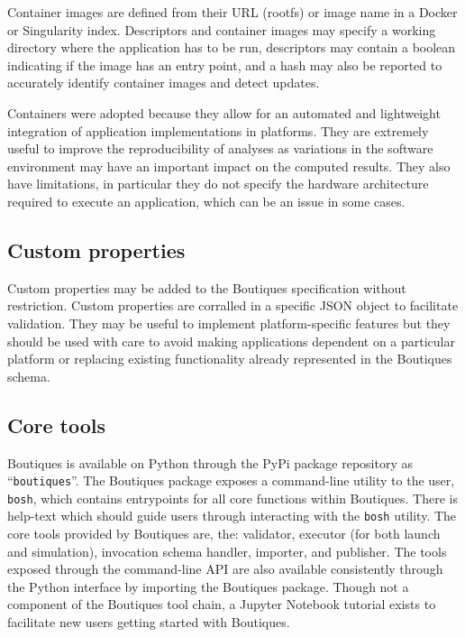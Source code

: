 \documentclass{article}
\newcommand{\boutiques}{Boutiques\xspace}
\begin{document}
Container images are defined from their URL (rootfs) or image name in
a Docker or Singularity index. Descriptors and container images may
specify a working directory where the application has to be run,
descriptors may contain a boolean indicating if the image has an entry
point, and a hash may also be reported to accurately identify
container images and detect updates.

Containers were adopted because they allow for an automated and
lightweight integration of application implementations in
platforms. They are extremely useful to improve the reproducibility of
analyses as variations in the software environment may have an
important impact on the computed results. They also have limitations,
in particular they do not specify the hardware architecture required
to execute an application, which can be an issue in some cases.


\subsection{Custom properties}

Custom properties may be added to the Boutiques specification without
restriction. Custom properties are corralled in a specific JSON object
to facilitate validation. They may be useful to implement
platform-specific features but they should be used with care to avoid
making applications dependent on a particular platform or replacing
existing functionality already represented in the \boutiques schema.

\subsection{Core tools} 

\boutiques is available on Python through the PyPi package repository
as ``\texttt{boutiques}''. The \boutiques package exposes a
command-line utility to the user, \texttt{bosh}, which contains
entrypoints for all core functions within \boutiques. There is
help-text which should guide users through interacting with the
\texttt{bosh} utility. The core tools provided by \boutiques are, the:
validator, executor (for both launch and simulation), invocation
schema handler, importer, and publisher. The tools exposed through the
command-line API are also available consistently through the Python
interface by importing the \boutiques package. Though not a component
of the \boutiques tool chain, a Jupyter Notebook tutorial exists to
facilitate new users getting started with \boutiques.
\end{document}
